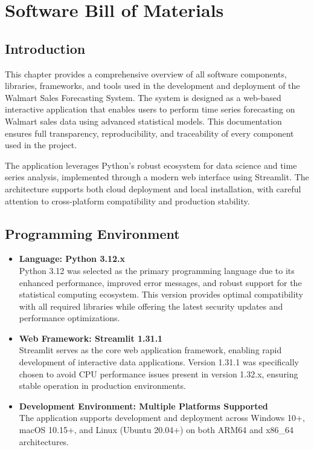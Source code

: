 %
%
%

\chapter{Software Bill of Materials}

\section*{Introduction}
This chapter provides a comprehensive overview of all software components, libraries, frameworks, and tools used in the development and deployment of the Walmart Sales Forecasting System. The system is designed as a web-based interactive application that enables users to perform time series forecasting on Walmart sales data using advanced statistical models. This documentation ensures full transparency, reproducibility, and traceability of every component used in the project.

The application leverages Python's robust ecosystem for data science and time series analysis, implemented through a modern web interface using Streamlit. The architecture supports both cloud deployment and local installation, with careful attention to cross-platform compatibility and production stability.

\section*{Programming Environment}

\begin{itemize}
	\item \textbf{Language: Python 3.12.x} \\
	Python 3.12 was selected as the primary programming language due to its enhanced performance, improved error messages, and robust support for the statistical computing ecosystem. This version provides optimal compatibility with all required libraries while offering the latest security updates and performance optimizations.
	
	\item \textbf{Web Framework: Streamlit 1.31.1} \\
	Streamlit serves as the core web application framework, enabling rapid development of interactive data applications. Version 1.31.1 was specifically chosen to avoid CPU performance issues present in version 1.32.x, ensuring stable operation in production environments.
	
	\item \textbf{Development Environment: Multiple Platforms Supported} \\
	The application supports development and deployment across Windows 10+, macOS 10.15+, and Linux (Ubuntu 20.04+) on both ARM64 and x86\_64 architectures.
\end{itemize}

